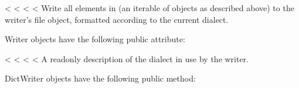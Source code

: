 \documentclass[letterpaper,10pt,english]{sphinxmanual}
\begin{document}
\begin{fulllineitems}
\label{\detokenize{csv:csv.csvwriter.writerows}}
<%
\pysigstartsignatures
<%
<%
<%
Write all elements in  (an iterable of  objects as described
above) to the writer’s file object, formatted according to the current
dialect.

\end{fulllineitems}


Writer objects have the following public attribute:

\vspace{5px}

\begin{fulllineitems}
\label{\detokenize{csv:csv.csvwriter.dialect}}<%
\pysigstartsignatures
<%
<%
<%
A read\sphinxhyphen{}only description of the dialect in use by the writer.

\end{fulllineitems}


DictWriter objects have the following public method:

\vspace{5px}
\end{document}
